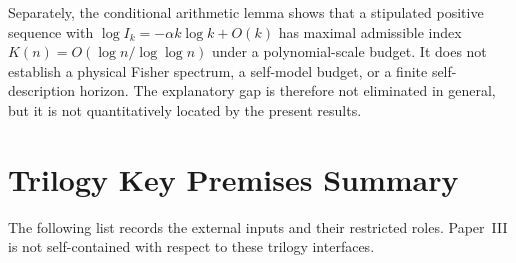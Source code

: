\documentclass[12pt]{article}
\theoremstyle{definition}
\theoremstyle{remark}
\begin{document}
Separately, the conditional arithmetic lemma shows that a stipulated
positive sequence with
\(\log I_k=-\alpha k\log k+O(k)\) has maximal admissible index
\(K(n)=O(\log n/\log\log n)\) under a polynomial-scale budget. It does
not establish a physical Fisher spectrum, a self-model budget, or a
finite self-description horizon. The explanatory gap is therefore not
eliminated in general, but it is not quantitatively located by the
present results.

\appendix

\section{Trilogy Key Premises Summary}\label{app:premises}

The following list records the external inputs and their restricted
roles. Paper~III is not self-contained with respect to these trilogy
interfaces.
\end{document}
